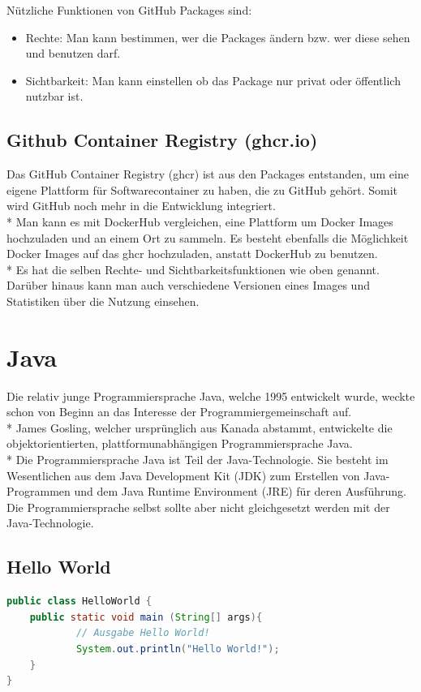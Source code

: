 Nützliche Funktionen von GitHub Packages sind:
\begin{itemize}
    \item Rechte: Man kann bestimmen, wer die Packages ändern bzw. wer diese sehen und benutzen darf.
    \item Sichtbarkeit: Man kann einstellen ob das Package nur privat oder öffentlich nutzbar ist.
\end{itemize}

\subsection{Github Container Registry (ghcr.io)}
Das GitHub Container Registry (ghcr) ist aus den Packages entstanden, um eine eigene Plattform für Softwarecontainer zu haben, die zu GitHub gehört.
Somit wird GitHub noch mehr in die Entwicklung integriert. \\*
Man kann es mit DockerHub vergleichen, eine Plattform um Docker Images hochzuladen und an einem Ort zu sammeln. 
Es besteht ebenfalls die Möglichkeit Docker Images auf das ghcr hochzuladen, anstatt DockerHub zu benutzen. \\*
Es hat die selben Rechte- und Sichtbarkeitsfunktionen wie oben genannt. Darüber hinaus kann man auch verschiedene Versionen eines Images und Statistiken
über die Nutzung einsehen.\cite{GHContReg} 


\section{Java}
\author{David Ignjatovic} 

Die relativ junge Programmiersprache Java, welche 1995 entwickelt wurde, weckte schon von Beginn an das Interesse der Programmiergemeinschaft auf. \cite{Java} \\*
James Gosling, welcher ursprünglich aus Kanada abstammt, entwickelte die objektorientierten, plattformunabhängigen Programmiersprache Java. \cite{JavaErfinder} \\*
Die Programmiersprache Java ist Teil der Java-Technologie. Sie besteht im Wesentlichen aus dem Java Development Kit (JDK) zum Erstellen von Java-Programmen und dem Java Runtime Environment (JRE) für deren Ausführung. 
Die Programmiersprache selbst sollte aber nicht gleichgesetzt werden mit der Java-Technologie. \cite{JavaSprache}

\subsection{Hello World}
\author{David Ignjatovic} 
\begin{lstlisting}[language=Java,caption=Java File HelloWorld,label=lst:impl:foo]
public class HelloWorld {
    public static void main (String[] args){
            // Ausgabe Hello World!
            System.out.println("Hello World!");
    }
}
\end{lstlisting}

